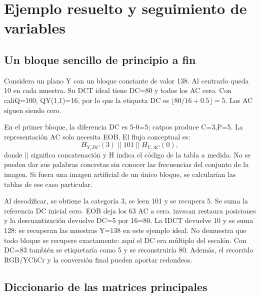 \documentclass[11pt,a4paper,oneside]{report}
\begin{document}
\chapter{Ejemplo resuelto y seguimiento de variables}
\section{Un bloque sencillo de principio a fin}

Considera un plano Y con un bloque constante de valor 138. Al centrarlo queda
10 en cada muestra. Su DCT ideal tiene DC=80 y todos los AC cero.
Con caliQ=100, QY(1,1)=16, por lo que la etiqueta DC es
$\lfloor80/16+0.5\rfloor=5$. Los AC siguen siendo cero.

En el primer bloque, la diferencia DC es 5-0=5; catpos produce C=3,P=5.
La representación AC solo necesita EOB. El flujo conceptual es:
\[
H_{Y,DC}(3)\;||\;101\;||\;H_{Y,AC}(0),
\]
donde $||$ significa concatenación y H indica el código de la tabla a medida.
No se pueden dar sus palabras concretas sin conocer las frecuencias del conjunto
de la imagen. Si fuera una imagen artificial de un único bloque, se calcularían
las tablas de ese caso particular.

Al decodificar, se obtiene la categoría 3, se leen 101 y se recupera 5.
Se suma la referencia DC inicial cero. EOB deja los 63 AC a cero. invscan
restaura posiciones y la descuantización devuelve DC=5 por 16=80.
La IDCT devuelve 10 y se suma 128: se recuperan las muestras Y=138 en este
ejemplo ideal. No demuestra que todo bloque se recupere exactamente: aquí
el DC era múltiplo del escalón. Con DC=83 también se etiquetaría como 5
y se reconstruiría 80. Además, el recorrido RGB/YCbCr y la conversión final
pueden aportar redondeos.


\section{Diccionario de las matrices principales}
\end{document}
